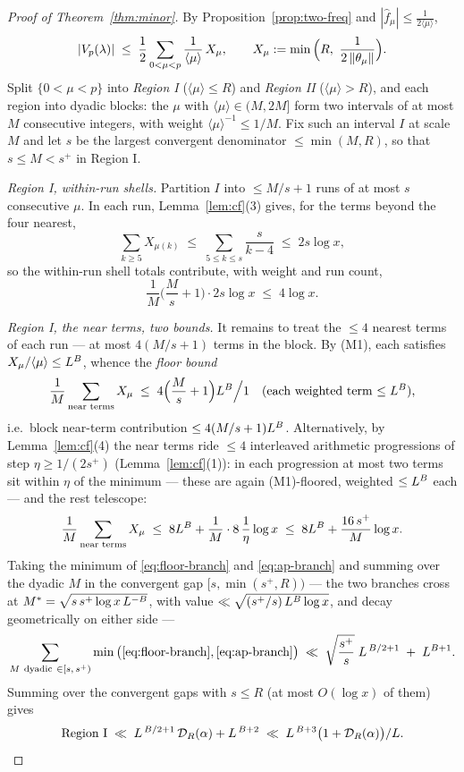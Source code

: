 \begin{proof}[Proof of Theorem~\ref{thm:minor}]
By Proposition~\ref{prop:two-freq} and
$|\hat f_\mu|\le\tfrac1{2\langle\mu\rangle}$,
\begin{equation}\label{eq:minor-start}
|V_p(\lambda)|\;\le\;\frac12\sum_{0<\mu<p}
\frac{1}{\langle\mu\rangle}\,X_\mu,
\qquad
X_\mu:=\min\Big(R,\ \frac{1}{2\left\| \theta_\mu\right\|}\Big).
\end{equation}
Split $\{0<\mu<p\}$ into \emph{Region I} ($\langle\mu\rangle\le R$) and
\emph{Region II} ($\langle\mu\rangle>R$), and each region into dyadic
blocks: the $\mu$ with $\langle\mu\rangle\in(M,2M]$ form two intervals of
at most $M$ consecutive integers, with weight
$\langle\mu\rangle^{-1}\le1/M$. Fix such an interval $I$ at scale $M$ and
let $s$ be the largest convergent denominator $\le\min(M,R)$, so that
$s\le M<s^{+}$ in Region I.

\medskip\noindent\emph{Region I, within-run shells.} Partition $I$ into
$\le M/s+1$ runs of at most $s$ consecutive $\mu$. In each run,
Lemma~\ref{lem:cf}(3) gives, for the terms beyond the four nearest,
\[
\sum_{k\ge5}X_{\mu(k)}\;\le\;\sum_{5\le k\le s}\frac{s}{k-4}
\;\le\;2s\log x ,
\]
so the within-run shell totals contribute, with weight and run count,
\[
\frac1M\Big(\frac Ms+1\Big)\cdot 2s\log x\;\le\;4\log x .
\]

\medskip\noindent\emph{Region I, the near terms, two bounds.} It remains
to treat the $\le4$ nearest terms of each run --- at most $4(M/s+1)$
terms in the block. By (M1), each satisfies
$X_\mu/\langle\mu\rangle\le L^{B}$, whence the \emph{floor bound}
\begin{equation}\label{eq:floor-branch}
\frac1M\sum_{\text{near terms}}X_\mu
\;\le\;4\Big(\frac Ms+1\Big)L^{B}\Big/1
\quad\text{(each weighted term $\le L^B$),}
\end{equation}
i.e.\ block near-term contribution $\le4(M/s+1)L^{B}$. Alternatively,
by Lemma~\ref{lem:cf}(4) the near terms ride $\le4$ interleaved
arithmetic progressions of step $\eta\ge1/(2s^{+})$
(Lemma~\ref{lem:cf}(1)): in each progression at most two terms sit within
$\eta$ of the minimum --- these are again (M1)-floored, weighted
$\le L^B$ each --- and the rest telescope:
\begin{equation}\label{eq:ap-branch}
\frac1M\sum_{\text{near terms}}X_\mu
\;\le\;8L^{B}
+\frac1M\cdot8\,\frac{1}{\eta}\log x
\;\le\;8L^{B}+\frac{16\,s^{+}}{M}\log x .
\end{equation}
Taking the minimum of \eqref{eq:floor-branch} and \eqref{eq:ap-branch}
and summing over the dyadic $M$ in the convergent gap $[s,\min(s^{+},R))$
--- the two branches cross at $M^*=\sqrt{s\,s^{+}\log x\,L^{-B}}$,
with value $\ll\sqrt{(s^{+}/s)\,L^{B}\log x}$, and decay
geometrically on either side ---
\[
\sum_{M\ \mathrm{dyadic}\ \in[s,\,s^{+})}
\min\big(\eqref{eq:floor-branch},\eqref{eq:ap-branch}\big)
\;\ll\;\sqrt{\frac{s^{+}}{s}}\;L^{\,B/2+1}
\;+\;L^{B+1} .
\]
Summing over the convergent gaps with $s\le R$ (at most $O(\log x)$ of
them) gives
\[
\text{Region I}\;\ll\;L^{\,B/2+1}\,\mathcal D_R(\alpha)
+L^{\,B+2}
\;\ll\;L^{\,B+3}\big(1+\mathcal D_R(\alpha)\big)/L .
\]


\end{proof}
